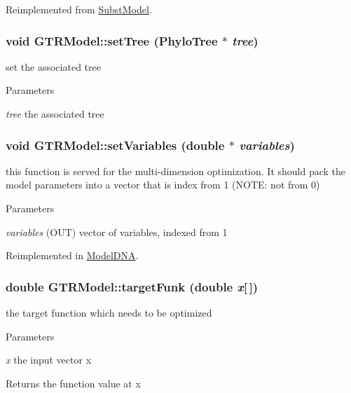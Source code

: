 Reimplemented from \hyperlink{classSubstModel_aa2d4bd724a699264b40dd5b2d129e29f}{SubstModel}.\hypertarget{classGTRModel_a121f6e38dae476820555a66ed3e6f10a}{
\subsubsection[{setTree}]{\setlength{\rightskip}{0pt plus 5cm}void GTRModel::setTree ({\bf PhyloTree} $\ast$ {\em tree})}}
\label{classGTRModel_a121f6e38dae476820555a66ed3e6f10a}
set the associated tree 
\begin{DoxyParams}{Parameters}
\item[{\em tree}]the associated tree \end{DoxyParams}
\hypertarget{classGTRModel_a1231f10a523ef280e1862b18b0549aa6}{
\subsubsection[{setVariables}]{\setlength{\rightskip}{0pt plus 5cm}void GTRModel::setVariables (double $\ast$ {\em variables})}}
\label{classGTRModel_a1231f10a523ef280e1862b18b0549aa6}
this function is served for the multi-\/dimension optimization. It should pack the model parameters into a vector that is index from 1 (NOTE: not from 0) 
\begin{DoxyParams}{Parameters}
\item[{\em variables}](OUT) vector of variables, indexed from 1 \end{DoxyParams}


Reimplemented in \hyperlink{classModelDNA_a83af5938f0b38371b6b971931b8748c2}{ModelDNA}.\hypertarget{classGTRModel_ac32444cf94b5c3f3240aa344d4bc40b1}{
\subsubsection[{targetFunk}]{\setlength{\rightskip}{0pt plus 5cm}double GTRModel::targetFunk (double {\em x}\mbox{[}$\,$\mbox{]})}}
\label{classGTRModel_ac32444cf94b5c3f3240aa344d4bc40b1}
the target function which needs to be optimized 
\begin{DoxyParams}{Parameters}
\item[{\em x}]the input vector x \end{DoxyParams}
\begin{DoxyReturn}{Returns}
the function value at x 
\end{DoxyReturn}


